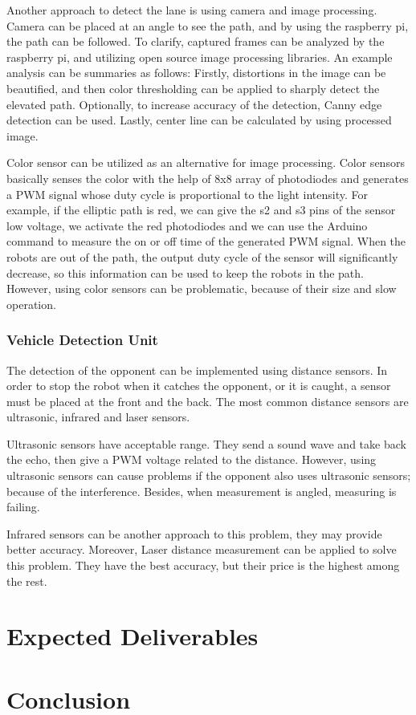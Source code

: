 \documentclass[a4paper,12pt]{article}
\begin{document}
Another approach to detect the lane is using camera and image processing. Camera can be placed at an angle to see the path, and by using the raspberry pi, the path can be followed. To clarify, captured frames can be analyzed by the raspberry pi, and utilizing open source image processing libraries. An example analysis can be summaries as follows: Firstly, distortions in the image can be beautified, and then color thresholding can be applied to sharply detect the elevated path. Optionally, to increase accuracy of the detection, Canny edge detection can be used. Lastly, center line can be calculated by using processed image. 

Color sensor can be utilized as an alternative for image processing. Color sensors basically senses the color with the help of 8x8 array of photodiodes and generates a PWM signal whose duty cycle is proportional to the light intensity. For example, if the elliptic path is red, we can give the s2 and s3 pins of the sensor low voltage, we activate the red photodiodes and we can use the Arduino command to measure the on or off time of the generated PWM signal. When the robots are out of the path, the output duty cycle of the sensor will significantly decrease, so this information can be used to keep the robots in the path. However, using color sensors can be problematic, because of their size and slow operation.

\subsubsection{Vehicle Detection Unit }
The detection of the opponent can be implemented using distance sensors. In order to stop the robot when it catches the opponent, or it is caught, a sensor must be placed at the front and the back. The most common distance sensors are ultrasonic, infrared and laser sensors. 

Ultrasonic sensors have acceptable range. They send a sound wave and take back the echo, then give a PWM voltage related to the distance. However, using ultrasonic sensors can cause problems if the opponent also uses ultrasonic sensors; because of the interference. Besides, when measurement is angled, measuring is failing. 

Infrared sensors can be another approach to this problem, they may provide better accuracy. Moreover, Laser distance measurement can be applied to solve this problem. They have the best accuracy, but their price is the highest among the rest. 


\section{Expected Deliverables}


\section{Conclusion}

\newpage
\begin{appendices}
	
		
		

	
\end{appendices}
\end{document}
